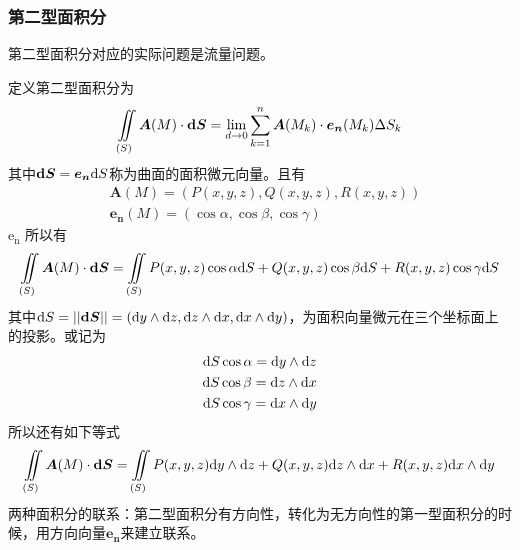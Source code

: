 \subsubsection{第二型面积分}
第二型面积分对应的实际问题是流量问题。

定义第二型面积分为
\begin{equation}\label{key}
	\iint\limits_{(S)}\bm{A}(M)\cdot \bm{\mathrm{d} S}=\lim\limits_{d \to 0}\sum_{k=1}^{n}\bm{A}(M_k)\cdot \bm{e_n}(M_k)\Delta S_k
\end{equation}
其中$\bm{\mathrm{d} S}=\bm{e_n}\mathrm{d} S$称为曲面的面积微元向量。且有
\begin{align*}
	&	\bm{A}(M)=(P(x,y,z),Q(x,y,z),R(x,y,z))\\
	&	\bm{e_n}(M)=(\cos \alpha,\cos \beta ,\cos \gamma)
\end{align*}
$\mathrm{e_n}$
所以有
\begin{equation}\label{key}
	\iint\limits_{(S)}\bm{A}(M)\cdot \bm{\mathrm{d} S}=\iint\limits_{(S)}P(x,y,z)\cos \alpha \mathrm{d} S+Q(x,y,z)\cos \beta \mathrm{d} S+R(x,y,z)\cos \gamma \mathrm{d} S
\end{equation}
其中$\mathrm{d} S=||\bm{\mathrm{d} S}||=(\mathrm{d} y \wedge \mathrm{d} z,\mathrm{d} z \wedge \mathrm{d} x,\mathrm{d} x \wedge \mathrm{d} y)$，为面积向量微元在三个坐标面上的投影。或记为
\begin{align*}
	\mathrm{d} S \cos \alpha=\mathrm{d} y \wedge \mathrm{d} z\\
	\mathrm{d} S \cos \beta=\mathrm{d} z \wedge \mathrm{d} x\\
	\mathrm{d} S \cos \gamma=\mathrm{d} x \wedge \mathrm{d} y\\
\end{align*}
所以还有如下等式
\begin{equation}\label{key}
	\iint\limits_{(S)}\bm{A}(M)\cdot \bm{\mathrm{d} S}=\iint\limits_{(S)}P(x,y,z)\mathrm{d} y \wedge \mathrm{d} z+Q(x,y,z)\mathrm{d} z \wedge \mathrm{d} x+R(x,y,z)\mathrm{d} x \wedge \mathrm{d} y
\end{equation}
两种面积分的联系：第二型面积分有方向性，转化为无方向性的第一型面积分的时候，用方向向量$\bm{e_n}$来建立联系。

